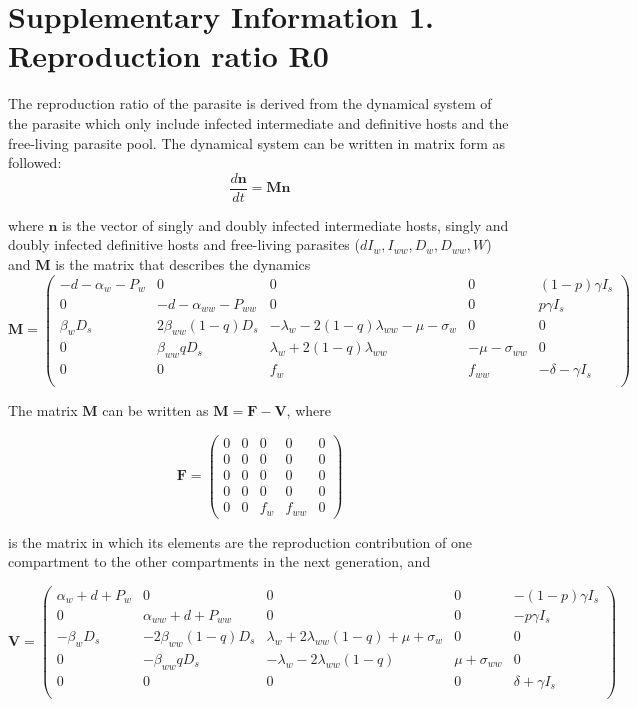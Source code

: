 \documentclass[11pt]{article}
\begin{document}
\section*{Supplementary Information 1. Reproduction ratio R0}

The reproduction ratio of the parasite is derived from the dynamical system of the parasite which only include infected intermediate and definitive hosts and the free-living parasite pool. The dynamical system can be written in matrix form as followed:
\[
\frac{d \mathbf{n}}{dt} = \mathbf{M} \mathbf{n}
\]

where $\mathbf{n}$ is the vector of singly and doubly infected intermediate hosts, singly and doubly infected definitive hosts and free-living parasites ($dI_w, I_{ww}, D_w, D_{ww}, W$) and $\mathbf{M}$ is the matrix that describes the dynamics
\[ \mathbf{M} = 
\begin{pmatrix}
- d - \alpha_w - P_w & 0 & 0 & 0 & (1 - p) \gamma I_s \\
0 & -d - \alpha_{ww} - P_{ww} & 0 & 0 & p \gamma I_s \\
\beta_w D_s & 2 \beta_{ww} (1-q) D_s &-\lambda_w - 2  (1-q)\lambda_{ww}  -\mu -\sigma_w & 0 & 0 \\
0 & \beta_{ww} q D_s  & \lambda_w + 2 (1-q) \lambda_{ww}  & -\mu - \sigma_{ww} & 0 \\
 0 & 0 & f_w & f_{ww} &- \delta - \gamma I_s  \\
\end{pmatrix}
\]

The matrix $\mathbf{M}$ can be written as $\mathbf{M} = \mathbf{F} - \mathbf{V}$, where

\[
\mathbf{F} = 
\begin{pmatrix}
0 & 0 & 0 & 0 & 0  \\
0 & 0 & 0 & 0 & 0  \\
0 & 0 & 0 & 0 & 0  \\
0 & 0 & 0 & 0 & 0  \\
0 & 0 & f_w & f_{ww} & 0
\end{pmatrix}
\]

is the matrix in which its elements are the reproduction contribution of one compartment to the other compartments in the next generation, and

\[
\mathbf{V} = 
\begin{pmatrix}
\alpha_w + d + P_w  & 0 & 0 & 0 & - (1 - p) \gamma  I_s\\
 0 & \alpha_{ww} + d + P_{ww} & 0 & 0 & - p \gamma I_s \\
- \beta_w D_s & -2 \beta_{ww}  (1 - q) D_s & \lambda_w + 2 \lambda_{ww} (1-q) + \mu + \sigma_w & 0 & 0 \\
 0 & -\beta_{ww} q D_s  & -\lambda_w - 2 \lambda_{ww} (1 - q) & \mu + \sigma_{ww} & 0 \\
 0 & 0 & 0 & 0 & \delta + \gamma I_s \\
\end{pmatrix}
\]
\end{document}
